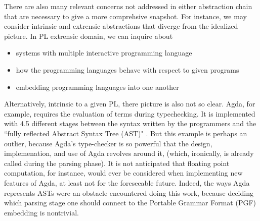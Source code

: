 There are also many relevant concerns not addressed in either abstraction chain
that are necessary to give a more comprehsive snapshot. For instance, we may
consider intrinsic and extrensic abstractions that diverge from the idealized
picture. In PL extrensic domain, we can inquire about 

\begin{itemize}[noitemsep]

\item systems with multiple interactive programming language 
\item how the programming languages behave with respect to given programs
\item embedding programming languages into one another

\end{itemize}

Alternatively, intrinsic to a given PL, there picture is also not so clear.
Agda, for example, requires the evaluation of terms during typechecking. It is
implemented with 4.5 different stages between the syntax written by the
programmers and the ``fully reflected Abstract Syntax Tree (AST)" \cite{andreasEmail}. But this
example is perhaps an outlier, because Agda's type-checker is so powerful that
the design, implemenation, and use of Agda revolves around it,
(which, ironically, is already called during the parsing phase). It is not
anticipated that floating point computation, for instance, would ever be
considered when implementing new features of Agda, at least not for the
foreseeable future. Indeed, the ways Agda represents ASTs were an obstacle
encountered doing this work, because deciding which parsing stage one should connect
to the Portable Grammar Format (PGF) embedding is nontrivial.



